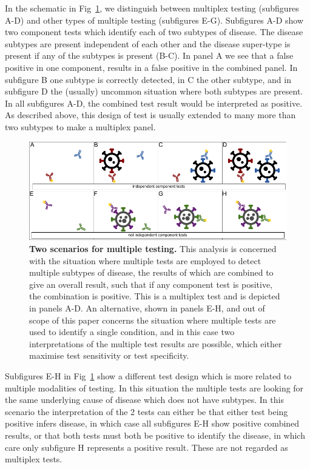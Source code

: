 \documentclass[10pt,letterpaper]{article}
\begin{document}
In the schematic in Fig~\ref{fig1}, we distinguish between multiplex testing (subfigures A-D) and other types of multiple testing (subfigures E-G). Subfigures A-D show two component tests which identify each of two subtypes of disease. The disease subtypes are present independent of each other and the disease super-type is present if any of the subtypes is present (B-C). In panel A we see that a false positive in one component, results in a false positive in the combined panel. In subfigure B one subtype is correctly detected, in C the other subtype, and in subfigure D the (usually) uncommon situation where both subtypes are present. In all subfigures A-D, the combined test result would be interpreted as positive. As described above, this design of test is usually extended to many more than two subtypes to make a multiplex panel.

\begin{figure}[!h]
\centerline{\includegraphics{fig/fig1-testerror.pdf}}
\caption{{\bf Two scenarios for multiple testing.}
This analysis is concerned with the situation where multiple tests are employed to detect multiple subtypes of disease, the results of which are combined to give an overall result, such that if any component test is positive, the combination is positive. This is a multiplex test and is depicted in panels A-D. An alternative, shown in panels E-H, and out of scope of this paper concerns the situation where multiple tests are used to identify a single condition, and in this case two interpretations of the multiple test results are possible, which either maximise test sensitivity or test specificity.}
\label{fig1}
\end{figure}

Subfigures E-H in Fig~\ref{fig1} show a different test design which is more related to multiple modalities of testing\cite{weinstein2005}. In this situation the multiple tests are looking for the same underlying cause of disease which does not have subtypes. In this scenario the interpretation of the 2 tests can either be that either test being positive infers disease, in which case all subfigures E-H show positive combined results, or that both tests must both be positive to identify the disease, in which care only subfigure H represents a positive result. These are not regarded as multiplex tests.
\end{document}
